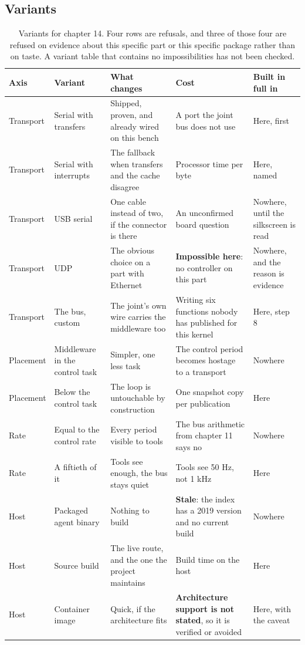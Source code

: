 \subsection*{Variants}

\begin{table}[H]\centering\small
\begin{tabular}{p{24mm}p{26mm}p{44mm}p{22mm}p{20mm}}
\toprule
Axis & Variant & What changes & Cost & Built in full in \\
\midrule
Transport & Serial with transfers & Shipped, proven, and already wired on this bench & A port the joint bus does not use & Here, first \\
Transport & Serial with interrupts & The fallback when transfers and the cache disagree & Processor time per byte & Here, named \\
Transport & USB serial & One cable instead of two, if the connector is there & An unconfirmed board question & Nowhere, until the silkscreen is read \\
Transport & UDP & The obvious choice on a part with Ethernet & \textbf{Impossible here}: no controller on this part & Nowhere, and the reason is evidence \\
Transport & The bus, custom & The joint's own wire carries the middleware too & Writing six functions nobody has published for this kernel & Here, step 8 \\
Placement & Middleware in the control task & Simpler, one less task & The control period becomes hostage to a transport & Nowhere \\
Placement & Below the control task & The loop is untouchable by construction & One snapshot copy per publication & Here \\
Rate & Equal to the control rate & Every period visible to tools & The bus arithmetic from chapter 11 says no & Nowhere \\
Rate & A fiftieth of it & Tools see enough, the bus stays quiet & Tools see 50 Hz, not 1 kHz & Here \\
Host & Packaged agent binary & Nothing to build & \textbf{Stale}: the index has a 2019 version and no current build & Nowhere \\
Host & Source build & The live route, and the one the project maintains & Build time on the host & Here \\
Host & Container image & Quick, if the architecture fits & \textbf{Architecture support is not stated}, so it is verified or avoided & Here, with the caveat \\
\bottomrule
\end{tabular}
\caption{Variants for chapter 14. Four rows are refusals, and three of those four are refused on evidence about this specific part or this specific package rather than on taste. A variant table that contains no impossibilities has not been checked.}
\end{table}

